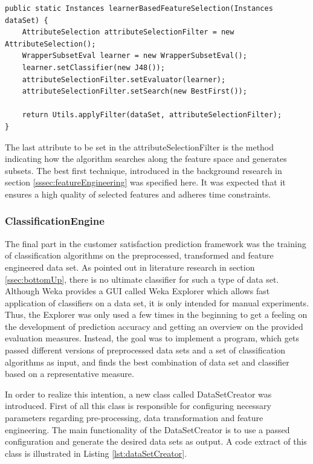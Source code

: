 \begin{lstlisting}[caption={Learner-based feature selection}, label={lst:wrapperBasedFs}]
public static Instances learnerBasedFeatureSelection(Instances dataSet) {
	AttributeSelection attributeSelectionFilter = new AttributeSelection();
	WrapperSubsetEval learner = new WrapperSubsetEval();
	learner.setClassifier(new J48());
	attributeSelectionFilter.setEvaluator(learner);
	attributeSelectionFilter.setSearch(new BestFirst());
	
	return Utils.applyFilter(dataSet, attributeSelectionFilter);
}
\end{lstlisting}

The last attribute to be set in the attributeSelectionFilter is the method indicating how the algorithm searches along the feature space and generates subsets. The best first technique, introduced in the background research in section \ref{sssec:featureEngineering} was specified here. It was expected that it ensures a high quality of selected features and adheres time constraints. 

\subsubsection{ClassificationEngine}
The final part in the customer satisfaction prediction framework was the training of classification algorithms on the preprocessed, transformed and feature engineered data set. As pointed out in literature research in section \ref{ssec:bottomUp}, there is no ultimate classifier for such a type of data set. Although Weka provides a GUI called Weka Explorer which allows fast application of classifiers on a data set, it is only intended for manual experiments. Thus, the Explorer was only used a few times in the beginning to get a feeling on the development of prediction accuracy and getting an overview on the provided evaluation measures. Instead, the goal was to implement a program, which gets passed different versions of preprocessed data sets and a set of classification algorithms as input, and finds the best combination of data set and classifier based on a representative measure. 

In order to realize this intention, a new class called DataSetCreator was introduced. First of all this class is responsible for configuring necessary parameters regarding pre-processing, data transformation and feature engineering. The main functionality of the DataSetCreator is to use a passed configuration and generate the desired data sets as output. A code extract of this class is illustrated in Listing \ref{lst:dataSetCreator}. 

